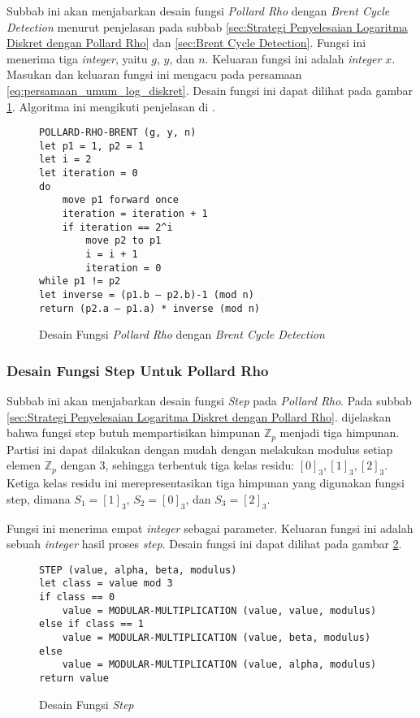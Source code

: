 Subbab ini akan menjabarkan desain fungsi \textit{Pollard Rho} dengan \textit{Brent Cycle Detection} menurut penjelasan pada subbab \ref{sec:Strategi Penyelesaian Logaritma Diskret dengan Pollard Rho} dan \ref{sec:Brent Cycle Detection}. Fungsi ini menerima tiga \textit{integer}, yaitu $ g $, $ y $, dan $ n $. Keluaran fungsi ini adalah \textit{integer} $ x $. Masukan dan keluaran fungsi ini mengacu pada persamaan \eqref{eq:persamaan_umum_log_diskret}. Desain fungsi ini dapat dilihat pada gambar \ref{psdo:brent_pollard_rho}. Algoritma ini mengikuti penjelasan di \cite{hac_numtheory,brent_montecarlo}.
\begin{figure}[h!]
\begin{lstlisting}[firstnumber=0]
POLLARD-RHO-BRENT (g, y, n)
let p1 = 1, p2 = 1
let i = 2
let iteration = 0
do
	move p1 forward once 
	iteration = iteration + 1
	if iteration == 2^i
		move p2 to p1
		i = i + 1
		iteration = 0
while p1 != p2
let inverse = (p1.b – p2.b)-1 (mod n)
return (p2.a – p1.a) * inverse (mod n)
\end{lstlisting}
\caption{Desain Fungsi \textit{Pollard Rho} dengan \textit{Brent Cycle Detection}}
\label{psdo:brent_pollard_rho}
\end{figure}

\subsubsection {Desain Fungsi Step Untuk Pollard Rho}
Subbab ini akan menjabarkan desain fungsi \textit{Step} pada \textit{Pollard Rho}. Pada subbab \ref{sec:Strategi Penyelesaian Logaritma Diskret dengan Pollard Rho}. dijelaskan bahwa fungsi step butuh mempartisikan himpunan $ \mathbb{Z}_p $ menjadi tiga himpunan. Partisi ini dapat dilakukan dengan mudah dengan melakukan modulus setiap elemen $ \mathbb{Z}_p $ dengan 3, sehingga terbentuk tiga kelas residu: $ [0]_3,[1]_3,[2]_3 $. Ketiga kelas residu ini merepresentasikan tiga himpunan yang digunakan fungsi \textit{}step, dimana $ S_1=[1]_3 $, $ S_2=[0]_3 $, dan $ S_3=[2]_3 $.

Fungsi ini menerima empat \textit{integer} sebagai parameter. Keluaran fungsi ini adalah sebuah \textit{integer} hasil proses \textit{step}. Desain fungsi ini dapat dilihat pada gambar \ref{psdo:step}.
\begin{figure}[h!]
\begin{lstlisting}[firstnumber=0]
STEP (value, alpha, beta, modulus)
let class = value mod 3
if class == 0
	value = MODULAR-MULTIPLICATION (value, value, modulus)
else if class == 1
	value = MODULAR-MULTIPLICATION (value, beta, modulus)
else
	value = MODULAR-MULTIPLICATION (value, alpha, modulus)
return value
\end{lstlisting}
\caption{Desain Fungsi \textit{Step}}
\label{psdo:step}
\end{figure}

